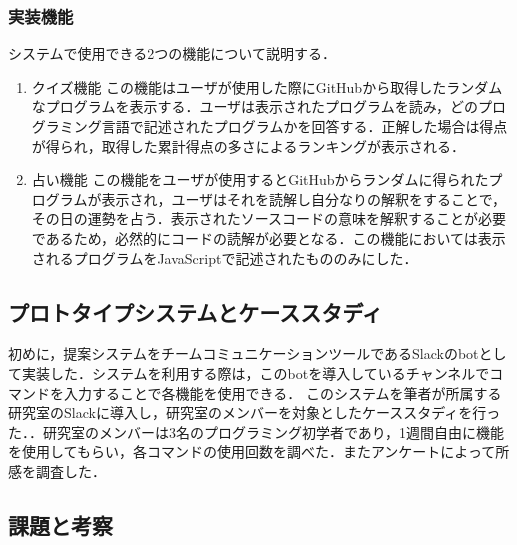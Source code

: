 \subsubsection{実装機能}
システムで使用できる2つの機能について説明する．
\begin{enumerate}
  \item クイズ機能
  この機能はユーザが使用した際にGitHubから取得したランダムなプログラムを表示する．ユーザは表示されたプログラムを読み，どのプログラミング言語で記述されたプログラムかを回答する．正解した場合は得点が得られ，取得した累計得点の多さによるランキングが表示される．
  \item 占い機能
  この機能をユーザが使用するとGitHubからランダムに得られたプログラムが表示され，ユーザはそれを読解し自分なりの解釈をすることで，その日の運勢を占う．表示されたソースコードの意味を解釈することが必要であるため，必然的にコードの読解が必要となる．この機能においては表示されるプログラムをJavaScriptで記述されたもののみにした．
\end{enumerate}
\subsection{プロトタイプシステムとケーススタディ}
初めに，提案システムをチームコミュニケーションツールであるSlackのbotとして実装した．システムを利用する際は，このbotを導入しているチャンネルでコマンドを入力することで各機能を使用できる．
このシステムを筆者が所属する研究室のSlackに導入し，研究室のメンバーを対象としたケーススタディを行った．．研究室のメンバーは3名のプログラミング初学者であり，1週間自由に機能を使用してもらい，各コマンドの使用回数を調べた．またアンケートによって所感を調査した．

\subsection{課題と考察}

